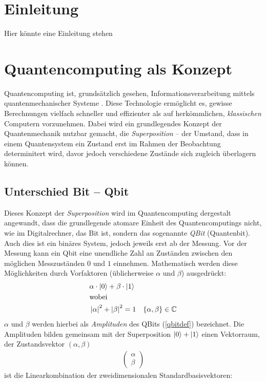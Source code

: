 
\chapter{Einleitung}
Hier könnte eine Einleitung stehen

\chapter{Quantencomputing als Konzept}
Quantencomputing ist, grundsätzlich gesehen, Informationsverarbeitung mittels quantenmechanischer Systeme \cite[1]{NielsenChuang}.
Diese Technologie ermöglicht es, gewisse Berechnungen vielfach schneller und effizienter als auf herkömmlichen, \textit{klassischen} Computern vorzunehmen. Dabei wird ein grundlegendes Konzept der Quantenmechanik nutzbar gemacht, die \textit{Superposition} -- der Umstand, dass in einem Quantensystem ein Zustand erst im Rahmen der Beobachtung determinitert wird, davor jedoch verschiedene Zustände sich zugleich überlagern können. 


\section{Unterschied Bit -- Qbit}
Dieses Konzept der \textit{Superposition} wird im Quantencomputing dergestalt angewandt, dass die grundlegende atomare Einheit des Quantencomputings nicht, wie im Digitalrechner, das Bit ist, sondern das sogenannte \textit{QBit} (Quantenbit).
Auch dies ist ein binäres System, jedoch jeweils erst ab der Messung.
Vor der Messung kann ein Qbit eine unendliche Zahl an Zuständen zwischen den möglichen Messzuständen $0$ und $1$ einnehmen.
Mathematisch werden diese \glqq Möglichkeiten\grqq{} durch Vorfaktoren (üblicherweise $\alpha$ und $\beta$) ausgedrückt:
\begin{align}
&\alpha \cdot \ket{0}+\beta \cdot \ket{1} \label{qbitdef} \\
&\text{wobei}\notag \\ 
&\left\lvert \alpha \right\rvert ^2 + \left\lvert \beta \right\rvert ^2 = 1 & \{ \alpha, \beta \} \in \mathbb{C}
\end{align}
$\alpha$ und $\beta$ werden hierbei als \textit{Amplituden} des QBits (\ref{qbitdef}) bezeichnet.
Die Amplituden bilden gemeinsam mit der Superposition $\ket{0}+\ket{1}$ einen Vektorraum, der Zustandsvektor $(\alpha, \beta)$
\begin{align}
    \begin{pmatrix}
        \alpha\\
        \beta
    \end{pmatrix}
\end{align}
ist die Linearkombination der zweidimensionalen Standardbasisvektoren\cite[22]{Homeister}:

